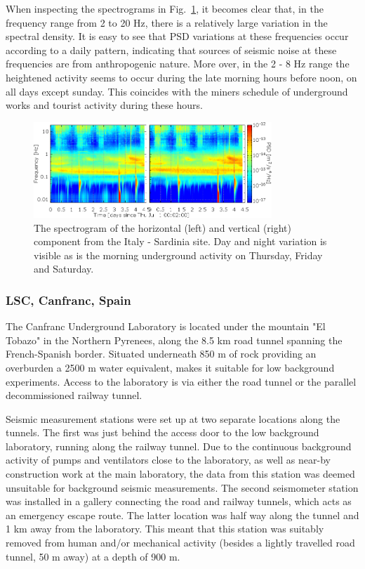 When inspecting the spectrograms in Fig.~\ref{fig:Lula-A_multiplot2}, it becomes clear that, in the frequency range from 2 to 20 Hz, there is a relatively large variation in the spectral density. It is easy to see that PSD variations at these frequencies occur according to a daily pattern, indicating that sources of seismic noise at these frequencies are from anthropogenic nature. More over, in the 2 - 8 Hz range the heightened activity seems to occur during the late morning hours before noon, on all days except sunday. This coincides with the miners schedule of underground works and tourist activity during these hours. 

\begin{figure}[h]	
	\begin{center}
		\includegraphics[width= 0.8\textwidth]{./Sec_SiteInfra/Figures/Lula-A_multiplot2}
		\caption{The spectrogram of the horizontal (left) and vertical (right) component from the Italy - Sardinia site. Day and night variation is visible as is the morning underground activity on Thursday, Friday and Saturday.}
		\label{fig:Lula-A_multiplot2}
	\end{center}
\end{figure}
\FloatBarrier
\subsubsection*{LSC, Canfranc, Spain}
The Canfranc Underground Laboratory is located under the mountain "El Tobazo" in the Northern Pyrenees, along the 8.5 km road tunnel spanning the French-Spanish border. Situated underneath 850 m of rock providing an overburden a 2500 m water equivalent, makes it suitable for low background experiments. Access to the laboratory is via either the road tunnel or the parallel decommissioned railway tunnel. 

Seismic measurement stations were set up at two separate locations along the tunnels. The first was just behind the access door to the low background laboratory, running along the railway tunnel. Due to the continuous background activity of pumps and ventilators close to the laboratory, as well as near-by construction work at the main laboratory, the data from this station was deemed unsuitable for background seismic measurements. The second seismometer station was installed in a gallery connecting the road and railway tunnels, which acts as an emergency escape route. The latter location was half way along the tunnel and 1 km away from the laboratory. This meant that this station was suitably removed from human and/or mechanical activity (besides a lightly travelled road tunnel, 50 m away) at a depth of 900 m. 

